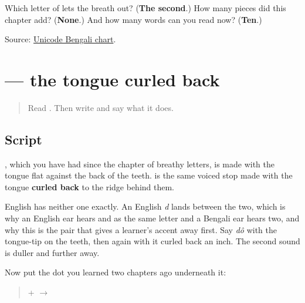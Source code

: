 \begin{tcolorbox}[breakable,colback=teal!4,colframe=teal!35!black,title={Before you move on}]
Which letter of \textbf{} lets the breath out? (\textbf{The second}.) How many pieces did this chapter add? (\textbf{None}.) And how many words can you read now? (\textbf{Ten}.)

Source: \href{https://www.unicode.org/charts/PDF/U0980.pdf}{Unicode Bengali chart}.
\end{tcolorbox}
\section[\texorpdfstring{\bn{ড} (ḍô)}{ড (ḍô)}]{ — the tongue curled back}

\label{lesson:BN-W04-dda}



\begin{quote}
Read \textbf{}. Then write \textbf{} and say what it does.
\end{quote}

\subsection*{Script}

\begin{quote}
\end{quote}

\textbf{}, which you have had since the chapter of breathy letters, is made with the tongue flat against the back of the teeth. \textbf{} is the same voiced stop made with the tongue \textbf{curled back} to the ridge behind them.

English has neither one exactly. An English \emph{d} lands between the two, which is why an English ear hears \textbf{} and \textbf{} as the same letter and a Bengali ear hears two, and why this is the pair that gives a learner's accent away first. Say \emph{dô} with the tongue-tip on the teeth, then again with it curled back an inch. The second sound is duller and further away.

Now put the dot you learned two chapters ago underneath it:

\begin{quote}
\textbf{} + \textbf{} $\to$ \textbf{}
\end{quote}

